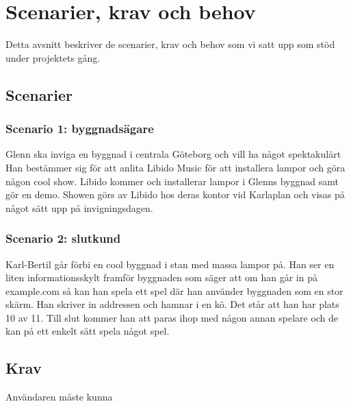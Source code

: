 \documentclass[a4paper,11pt]{article}
\begin{document}
\section{Scenarier, krav och behov}

  Detta avsnitt beskriver de scenarier, krav och behov som vi satt upp som
  stöd under projektets gång.

\subsection{Scenarier}

\subsubsection*{Scenario 1: byggnadsägare}

  Glenn ska inviga en byggnad i centrala Göteborg och vill ha något spektakulärt
  Han bestämmer sig för att anlita Libido Music för att installera lampor och
  göra någon cool show. Libido kommer och installerar lampor i Glenns byggnad
  samt gör en demo. Showen görs av Libido hos deras kontor vid Karlaplan och
  visas på något sätt upp på invigningsdagen.

\subsubsection*{Scenario 2: slutkund}
  Karl-Bertil går förbi en cool byggnad i stan med massa lampor på. Han ser en
  liten informationsskylt framför byggnaden som säger att om han går in på
  example.com så kan han spela ett spel där han använder byggnaden som en stor
  skärm. Han skriver in addressen och hamnar i en kö. Det står att han har plats
  10 av 11.  Till slut kommer han att paras ihop med någon annan spelare och de
  kan på ett enkelt sätt spela något spel.


\subsection{Krav}

  Användaren måste kunna
\end{document}
